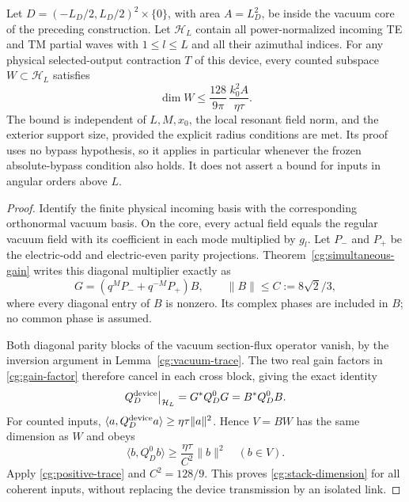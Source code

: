 \begin{theorem}
\label{cg:stack-count}
Let $D=(-L_D/2,L_D/2)^2\times\{0\}$, with area $A=L_D^2$, be
inside the vacuum core of the preceding construction.  Let
$\mathcal H_L$ contain all power-normalized incoming TE and TM
partial waves with $1\leq l\leq L$ and all their azimuthal indices.
For any physical selected-output contraction $T$ of this device,
every counted subspace $W\subset\mathcal H_L$ satisfies
\begin{equation}\label{cg:stack-dimension}
 \dim W\leq\frac{128}{9\pi}\,\frac{k_0^2A}{\eta\tau}.
\end{equation}
The bound is independent of $L,M,x_0$, the local resonant field norm,
and the exterior support size, provided the explicit radius conditions
are met.  Its proof uses no bypass hypothesis, so it applies in
particular whenever the frozen absolute-bypass condition also holds.
It does not assert a bound for inputs in angular orders above $L$.
\end{theorem}
\begin{proof}
Identify the finite physical incoming basis with the corresponding
orthonormal vacuum basis.  On the core, every actual field equals
the regular vacuum field with its coefficient in each mode multiplied
by $g_l$.  Let $P_-$ and $P_+$ be the electric-odd and electric-even
parity projections.  Theorem~\ref{cg:simultaneous-gain} writes this
diagonal multiplier exactly as
\begin{equation}\label{cg:gain-factor}
 G=(q^MP_-+q^{-M}P_+)B,
 \qquad \|B\|\leq C:=8\sqrt2/3,
\end{equation}
where every diagonal entry of $B$ is nonzero.  Its complex phases
are included in $B$; no common phase is assumed.

Both diagonal parity blocks of the vacuum section-flux operator
vanish, by the inversion argument in Lemma~\ref{cg:vacuum-trace}.
The two real gain factors in \eqref{cg:gain-factor} therefore cancel
in each cross block, giving the exact identity
\begin{equation}\label{cg:flux-cancellation}
 Q_D^{\rm device}\big|_{\mathcal H_L}
       =G^*Q_D^0G=B^*Q_D^0B.
\end{equation}
For counted inputs, $\langle a,Q_D^{\rm device}a\rangle
\geq\eta\tau\|a\|^2$.  Hence $V=BW$ has the same dimension as
$W$ and obeys
\begin{equation}
 \langle b,Q_D^0b\rangle
       \geq\frac{\eta\tau}{C^2}\|b\|^2\quad(b\in V).
\end{equation}
Apply \eqref{cg:positive-trace} and $C^2=128/9$.
This proves \eqref{cg:stack-dimension} for all coherent inputs,
without replacing the device transmission by an isolated link.
\end{proof}

